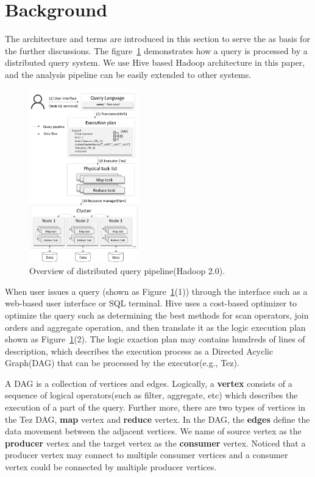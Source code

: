 \section{Background}\label{sec:background}

The architecture and terms are introduced in this section to serve the as basis for the further discussions. 
The figure~\ref{fig:architecture} demonstrates how a query is processed by a distributed query system. We use Hive based Hadoop architecture in this paper, and the analysis pipeline can be easily extended to other systems.

\begin{figure}[t]
	\centering
	\includegraphics[width=0.42\textwidth]{figures/background/arc.png}
	\vspace{-3mm}
	\caption{Overview of distributed query pipeline(Hadoop 2.0).}
	\label{fig:architecture}
	\vspace{-3mm}
\end{figure}

When user issues a query (shown as Figure~\ref{fig:architecture}(1)) through the interface such as a web-based user interface or SQL terminal. 
Hive uses a cost-based optimizer to optimize the query such as determining the best methods for scan operators, join orders and aggregate operation, and then translate it as the logic execution plan shown as Figure~\ref{fig:architecture}(2). The logic exaction plan may contains hundreds of lines of description, which describes the execution process as a Directed Acyclic Graph(DAG) that can be processed by the executor(e.g., Tez). 

A DAG is a collection of vertices and edges. Logically, a \textbf{vertex} consists of a sequence of logical operators(such as filter, aggregate, etc) which describes the execution of a part of the query. Further more, there are two types of vertices in the Tez DAG, \textbf{map} vertex and \textbf{reduce} vertex.  
In the DAG,  the \textbf{edges} define the data movement between the adjacent vertices. We name of source vertex as the \textbf{producer} vertex and the target vertex as the \textbf{consumer} vertex. Noticed that a producer vertex may connect to multiple consumer vertices and a consumer vertex could be connected by multiple producer vertices.  

